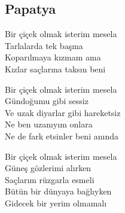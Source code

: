 \subsection{Papatya}

Bir çiçek olmak isterim mesela \\
Tarlalarda tek başına \\
Koparılmaya kızmam ama \\
Kızlar saçlarına taksın beni

\noindent\newline
Bir çiçek olmak isterim mesela \\
Gündoğumu gibi sessiz \\
Ve uzak diyarlar gibi hareketsiz \\
Ne ben uzanıyım onlara \\
Ne de fark etsinler beni anında

\noindent\newline
Bir çiçek olmak isterim mesela \\
Güneş gözlerimi alırken \\
Saçlarım rüzgarla esmeli \\
Bütün bir dünyaya bağlıyken \\
Gidecek bir yerim olmamalı